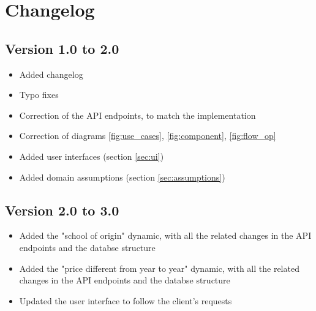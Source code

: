 \chapter{Changelog}
\section{Version 1.0 to 2.0}
\begin{itemize}
    \item Added changelog
    \item Typo fixes
    \item Correction of the API endpoints, to match the implementation
    \item Correction of diagrams \ref{fig:use_cases}, \ref{fig:component}, \ref{fig:flow_op}
    \item Added user interfaces (section \ref{sec:ui})
    \item Added domain assumptions (section \ref{sec:assumptions})
\end{itemize}
\section{Version 2.0 to 3.0}
\begin{itemize}
    \item Added the "school of origin" dynamic, with all the related changes in the API endpoints and the databse structure
    \item Added the "price different from year to year" dynamic, with all the related changes in the API endpoints and the databse structure
    \item Updated the user interface to follow the client's requests
\end{itemize}